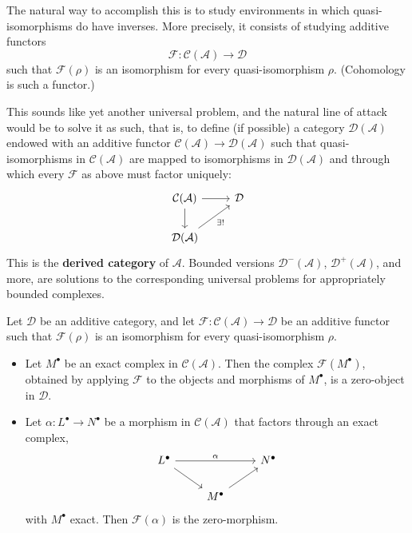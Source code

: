 The natural way to accomplish this is to study environments in which quasi-isomorphisms do have inverses. More precisely, it consists of studying additive functors
\[\mathscr{F}:\mathcal{C}(\mathcal{A})\to\mathcal{D}\]
such that $\mathscr{F}(\rho)$ is an isomorphism for every quasi-isomorphism $\rho$. (Cohomology
is such a functor.)\par
This sounds like yet another universal problem, and the natural line of attack would be to solve it as such, that is, to define (if possible) a category $\mathcal{D}(\mathcal{A})$ endowed with an additive functor $\mathcal{C}(\mathcal{A})\to\mathcal{D}(\mathcal{A})$ such that quasi-isomorphisms in $\mathcal{C}(\mathcal{A})$ are mapped to isomorphisms in $\mathcal{D}(\mathcal{A})$ and through which every $\mathscr{F}$ as above must factor uniquely:
\[\begin{tikzcd}
\mathcal{C}(\mathcal{A})\ar[d]\ar[r]&\mathcal{D}\\
\mathcal{D}(\mathcal{A})\ar[ru,swap,"\exists!"]
\end{tikzcd}\]
This is the \textbf{derived category} of $\mathcal{A}$. Bounded versions $\mathcal{D}^-(\mathcal{A})$, $\mathcal{D}^+(\mathcal{A})$, and more, are solutions to the corresponding universal problems for appropriately bounded complexes.
\begin{lemma}\label{add functor quasi-iso into iso}
Let $\mathcal{D}$ be an additive category, and let $\mathscr{F}:\mathcal{C}(\mathcal{A})\to\mathcal{D}$ be an additive functor such that $\mathscr{F}(\rho)$ is an isomorphism for every quasi-isomorphism $\rho$.
\begin{itemize}
\item Let $M^\bullet$ be an exact complex in $\mathcal{C}(\mathcal{A})$. Then the complex $\mathscr{F}(M^\bullet)$, obtained by applying $\mathscr{F}$ to the objects and morphisms of $M^\bullet$, is a zero-object in $\mathcal{D}$.
\item Let $\alpha:L^\bullet\to N^\bullet$ be a morphism in $\mathcal{C}(\mathcal{A})$ that factors through an exact complex,
\[\begin{tikzcd}
L^\bullet\ar[rr,"\alpha"]\ar[rd]&&N^\bullet\\
&M^\bullet\ar[ru]&
\end{tikzcd}\]
with $M^\bullet$ exact. Then $\mathscr{F}(\alpha)$ is the zero-morphism.
\end{itemize}
\end{lemma}
